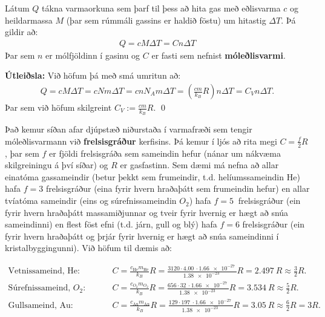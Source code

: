 \ifdefined \wholebook \else\documentclass[oneside]{book}\usepackage{EdlBook}\graphicspath{{figures/}}
\begin{document}
\begin{tcolorbox}
\begin{theorem}
Látum $Q$ tákna varmaorkuna sem þarf til þess að hita gas með eðlisvarma $c$ og heildarmassa $M$ (þar sem rúmmáli gassins er haldið föstu) um hitastig $\Delta T$. Þá gildir að:
\begin{align*}
    Q = cM\Delta T = Cn\Delta T
\end{align*}
Þar sem $n$ er mólfjöldinn í gasinu og $C$ er fasti sem nefnist \textbf{móleðlisvarmi}.
\end{theorem}
\end{tcolorbox}

\textbf{Útleiðsla:} Við höfum þá með smá umritun að:
\begin{align*}
    Q = cM\Delta T = cNm \Delta T = cn N_A m \Delta T = \left( \frac{c m}{k_B}R \right) n \Delta T = C_V n \Delta T.
\end{align*}
Þar sem við höfum skilgreint $C_V := \frac{cm}{k_B}R$. \qed

\vspace{0.2cm}

Það kemur síðan afar djúpstæð niðurstaða í varmafræði sem tengir móleðlisvarmann við \textbf{frelsisgráður} kerfisins. Þá kemur í ljós að rita megi $C = \frac{f}{2}R$, þar sem $f$ er fjöldi frelsisgráða sem sameindin hefur (nánar um nákvæma skilgreiningu á því síðar) og $R$ er gasfastinn. Sem dæmi má nefna að allar einatóma gassameindir (betur þekkt sem frumeindir, t.d. helíumssameindin $\text{He}$) hafa $f = 3$ frelsisgráður (eina fyrir hvern hraðaþátt sem frumeindin hefur) en allar tvíatóma sameindir (eins og súrefnissameindin $O_2$) hafa $f = \SI{5}{}$ frelsisgráður (ein fyrir hvern hraðaþátt massamiðjunnar og tveir fyrir hvernig er hægt að snúa sameindinni) en flest föst efni (t.d. járn, gull og blý) hafa $f = 6$ frelsisgráður (ein fyrir hvern hraðaþátt og þrjár fyrir hvernig er hægt að snúa sameindinni í kristalbyggingunni). Við höfum til dæmis að:

\begin{align*}
    \text{Vetnissameind, $\text{He}$:}& \hspace{1cm} C = \frac{c_{\text{He}}m_{\text{He}}}{k_B} R = \frac{3120 \cdot \SI{4,00}{} \cdot \SI{1.66e-27}{}}{\SI{1.38e-23}{}} R = \SI{2.497}{}R \approx \frac{3}{2}R. \\
    \text{Súrefnissameind, $O_2$:}& \hspace{1cm} C = \frac{c_{\text{$O_2$}}m_{\text{$O_2$}}}{k_B} R = \frac{656 \cdot \SI{32}{} \cdot \SI{1.66e-27}{}}{\SI{1.38e-23}{}} R = \SI{3.534}{}R \approx \frac{5}{2}R. \\
    \text{Gullsameind, $\text{Au}$:}& \hspace{1cm} C = \frac{c_{\text{Au}}m_{\text{Au}}}{k_B} R = \frac{129 \cdot \SI{197}{} \cdot \SI{1.66e-27}{}}{\SI{1.38e-23}{}} R = \SI{3.05}{}R \approx \frac{6}{2}R = 3R.
\end{align*}
\end{document}
